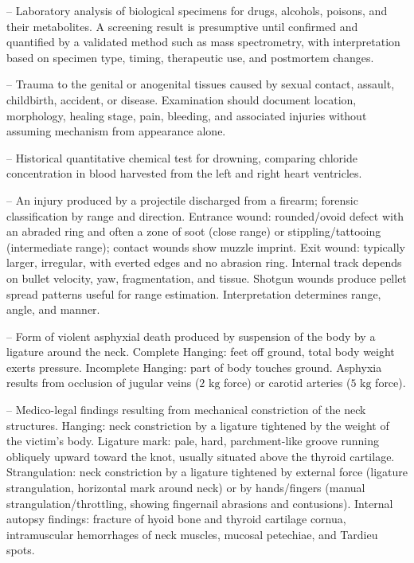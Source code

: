 -- Laboratory analysis of biological specimens for drugs, alcohols, poisons, and their metabolites. A screening result is presumptive until confirmed and quantified by a validated method such as mass spectrometry, with interpretation based on specimen type, timing, therapeutic use, and postmortem changes.

-- Trauma to the genital or anogenital tissues caused by sexual contact, assault, childbirth, accident, or disease. Examination should document location, morphology, healing stage, pain, bleeding, and associated injuries without assuming mechanism from appearance alone.

-- Historical quantitative chemical test for drowning, comparing chloride concentration in blood harvested from the left and right heart ventricles.

-- An injury produced by a projectile discharged from a firearm; forensic classification by range and direction. Entrance wound: rounded/ovoid defect with an abraded ring and often a zone of soot (close range) or stippling/tattooing (intermediate range); contact wounds show muzzle imprint. Exit wound: typically larger, irregular, with everted edges and no abrasion ring. Internal track depends on bullet velocity, yaw, fragmentation, and tissue. Shotgun wounds produce pellet spread patterns useful for range estimation. Interpretation determines range, angle, and manner.

-- Form of violent asphyxial death produced by suspension of the body by a ligature around the neck. Complete Hanging: feet off ground, total body weight exerts pressure. Incomplete Hanging: part of body touches ground. Asphyxia results from occlusion of jugular veins ($2\text{ kg}$ force) or carotid arteries ($5\text{ kg}$ force).

-- Medico-legal findings resulting from mechanical constriction of the neck structures. Hanging: neck constriction by a ligature tightened by the weight of the victim's body. Ligature mark: pale, hard, parchment-like groove running obliquely upward toward the knot, usually situated above the thyroid cartilage. Strangulation: neck constriction by a ligature tightened by external force (ligature strangulation, horizontal mark around neck) or by hands/fingers (manual strangulation/throttling, showing fingernail abrasions and contusions). Internal autopsy findings: fracture of hyoid bone and thyroid cartilage cornua, intramuscular hemorrhages of neck muscles, mucosal petechiae, and Tardieu spots.

